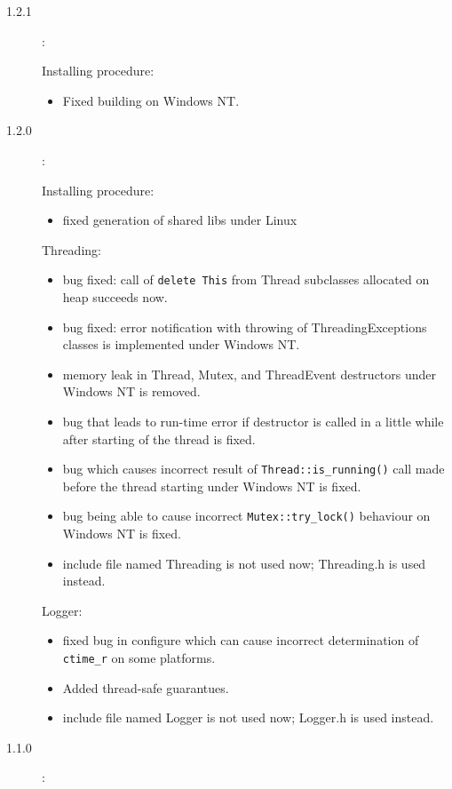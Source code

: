 \documentclass[10pt]{article}
\newenvironment{component}[1]{\par#1:\begin{itemize}}{\end{itemize}}
\begin{document}
\begin{description}
 \item [1.2.1]:
       \begin{component}{Installing procedure}
         \item Fixed building on Windows NT.
       \end{component}

 \item [1.2.0]:

       \begin{component}{Installing procedure}
         \item fixed generation of shared libs under Linux
       \end{component}

       \begin{component}{Threading}
         \item bug fixed: call of \verb|delete This| from Thread subclasses allocated on heap succeeds now.
         \item bug fixed: error notification with throwing of ThreadingExceptions classes is implemented under Windows NT.
         \item memory leak in Thread, Mutex, and ThreadEvent destructors under Windows NT is removed.
         \item bug that leads to run-time error if destructor is called in a little while 
               after starting of the thread is fixed.
         \item bug which causes incorrect result of \verb|Thread::is_running()| call 
               made before the thread starting under Windows NT is fixed.
         \item bug being able to cause incorrect \verb|Mutex::try_lock()| behaviour on Windows NT is fixed.
         \item include file named Threading is not used now; Threading.h is used instead.
       \end{component}

       \begin{component}{Logger}
         \item fixed bug in configure which can cause incorrect determination of \verb|ctime_r| on some platforms.
         \item Added thread-safe guarantues.
         \item include file named Logger is not used now; Logger.h is used instead. 
       \end{component}

 \item [1.1.0]:


\end{description}
\end{document}
